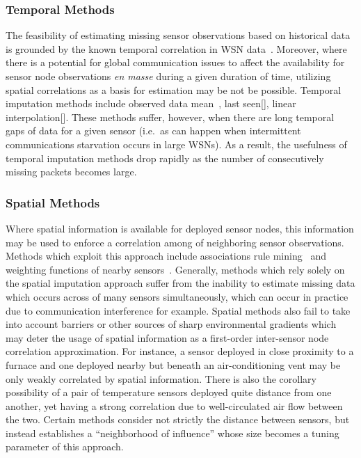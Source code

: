 \subsubsection{Temporal Methods}
The feasibility of estimating missing sensor observations based on historical data is grounded by the known temporal correlation in WSN data~\cite{akyildiz2004exploiting}.
Moreover, where there is a potential for global communication issues to affect the availability for sensor node observations \emph{en masse} during a given duration of time, utilizing spatial correlations as a basis for estimation may be not be possible.
Temporal imputation methods include observed data mean~\cite{madden2005tinydb,setz2009combining}, last seen[], linear interpolation[].
These methods suffer, however, when there are long temporal gaps of data for a given sensor (i.e.\ as can happen when intermittent communications starvation occurs in large WSNs).
As a result, the usefulness of temporal imputation methods drop rapidly as the number of consecutively missing packets becomes large.

\subsubsection{Spatial Methods}
Where spatial information is available for deployed sensor nodes, this information may be used to enforce a correlation among of neighboring sensor observations.
Methods which exploit this approach include associations rule mining~\cite{le2005estimating,jiang2007estimating} and weighting functions of nearby sensors~\cite{li2008spatial,li2008data,pan2010k}.
Generally, methods which rely solely on the spatial imputation approach suffer from the inability to estimate missing data which occurs across of many sensors simultaneously, which can occur in practice due to communication interference for example.
Spatial methods also fail to take into account barriers or other sources of sharp environmental gradients which may deter the usage of spatial information as a first-order inter-sensor node correlation approximation.
For instance, a sensor deployed in close proximity to a furnace and one deployed nearby but beneath an air-conditioning vent may be only weakly correlated by spatial information.
There is also the corollary possibility of a pair of temperature sensors deployed quite distance from one another, yet having a strong correlation due to well-circulated air flow between the two.
Certain methods consider not strictly the distance between sensors, but instead establishes a ``neighborhood of influence'' whose size becomes a tuning parameter of this approach.

